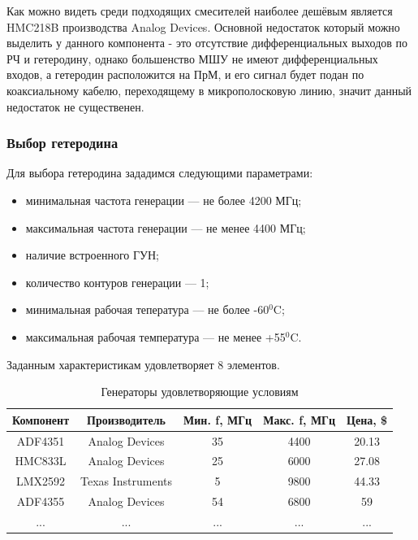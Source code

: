 \documentclass[utf8x, 14pt, oneside, a4paper]{article}
\begin{document}
				Как можно видеть среди подходящих смесителей наиболее дешёвым является HMC218B производства Analog Devices. Основной недостаток который можно выделить у данного компонента - это отсутствие дифференциальных выходов по РЧ и гетеродину, однако большенство МШУ не имеют дифференциальных входов, а гетеродин расположится на ПрМ, и его сигнал будет подан по коаксиальному кабелю, переходящему в микрополосковую линию, значит данный недостаток не существенен.
				
			\subsubsection{Выбор гетеродина}
				Для выбора гетеродина зададимся следующими параметрами:
				
				\begin{itemize}
					\item минимальная частота генерации --- не более 4200 МГц;
					\item максимальная частота генерации --- не менее 4400 МГц;
					\item наличие встроенного ГУН;
					\item количество контуров генерации --- 1;
					\item минимальная рабочая тепература --- не более -60$^0$C;
					\item максимальная рабочая температура --- не менее +55$^0$C.
				\end{itemize}
				
				\vspace{\baselineskip}
				
				Заданным характеристикам удовлетворяет 8 элементов.
				
				\begin{table}[H]	
					\centering
					\begin{tabular}{|c|c|c|c|c|}
						\hline
						Компонент & Производитель & Мин. f, МГц & Макс. f, МГц & Цена, \$ \\
						\hline
						ADF4351 & Analog Devices & 35 & 4400 & 20.13 \\
						\hline
						HMC833L & Analog Devices & 25 & 6000 & 27.08 \\
						\hline
						LMX2592 & Texas Instruments & 5 & 9800 & 44.33 \\
						\hline
						ADF4355 & Analog Devices & 54 & 6800 & 59 \\
						\hline
						... & ... & ... & ... & ... \\
						\hline
					\end{tabular}
					\caption{Генераторы удовлетворяющие условиям}
					\label{table:Amp3}
				\end{table}
				
\end{document}
